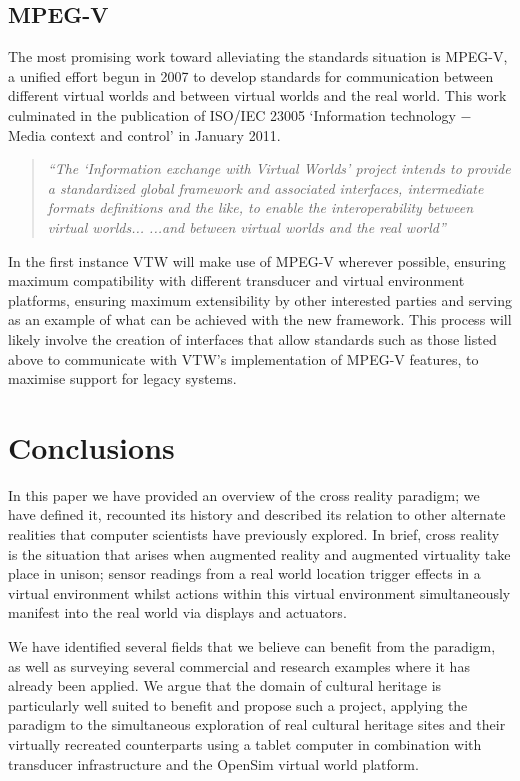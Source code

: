 \documentclass{sig-alternate}
\begin{document}
{\subsection{MPEG-V}
The most promising work toward alleviating the standards situation is MPEG-V, a unified effort begun in 2007 to develop standards for communication between different virtual worlds and between virtual worlds and the real world. This work culminated in the publication of ISO/IEC 23005 `Information technology $-$ Media context and control' in January 2011.

\begin{quotation}
	\textit{``The `Information exchange with Virtual Worlds' project intends to provide a standardized global framework and associated interfaces, intermediate formats definitions and the like, to enable the interoperability between virtual worlds... ...and between virtual worlds and the real world''}~\cite{Gelissen2008}
\end{quotation}

In the first instance VTW will make use of MPEG-V wherever possible, ensuring maximum compatibility with different transducer and virtual environment platforms, ensuring maximum extensibility by other interested parties and serving as an example of what can be achieved with the new framework. This process will likely involve the creation of interfaces that allow standards such as those listed above to communicate with VTW's implementation of MPEG-V features, to maximise support for legacy systems.

\section{Conclusions}
In this paper we have provided an overview of the cross reality paradigm; we have defined it, recounted its history and described its relation to other alternate realities that computer scientists have previously explored. In brief, cross reality is the situation that arises when augmented reality and augmented virtuality take place in unison; sensor readings from a real world location trigger effects in a virtual environment whilst actions within this virtual environment simultaneously manifest into the real world via displays and actuators.

We have identified several fields that we believe can benefit from the paradigm, as well as surveying several commercial and research examples where it has already been applied. We argue that the domain of cultural heritage is particularly well suited to benefit and propose such a project, applying the paradigm to the simultaneous exploration of real cultural heritage sites and their virtually recreated counterparts using a tablet computer in combination with transducer infrastructure and the OpenSim virtual world platform.

}
\end{document}
